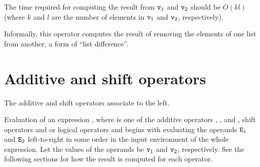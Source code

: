 The time required for computing the result from ${\tt{\sl v}}_1$ and
${\tt{\sl v}}_2$ should be %
$O(kl)$ (where $k$ and $l$ are the number of elements in
${\tt{\sl v}}_1$ and ${\tt{\sl v}}_2$, respectively).

Informally, this operator computes the result of removing the elements of one list
from another, a form of ``list difference''.


\section{Additive and shift operators}

\label{section:additive}
\label{section:shift}

The additive and shift operators associate to the left.

\SYNTAX

\begin{rules}
       {   \OR
           \OR
           \OR
           \OR
        }


\end{rules}

\EVALUATION

Evaluation of an expression , where
 is one of the additive operators \TXT{+}, \TXT{-}, 
and , shift operators  and  or logical
operators  and  begins with evaluating the operands
${\tt{\sl E}}_1$ and ${\tt{\sl E}}_2$
\ifStd left-to-right \fi \ifOld in some order \fi
in the input environment of the whole expression.  Let the values
of the operands be ${\tt{\sl v}}_1$ and ${\tt{\sl v}}_2$, respectively.
See the following sections for how the result is computed for each
operator.


